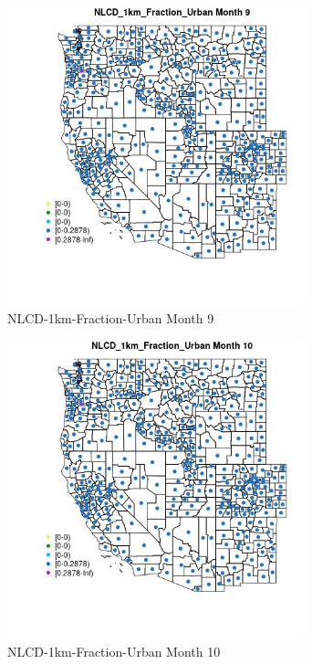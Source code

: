 \begin{figure} 
\centering  
\includegraphics[width=0.77\textwidth]{Code_Outputs/df_report_ML_predictors_CountyCentroid_Locations_Dates_2008-01-01to2018-12-31_MapObsMo9NLCD_1km_Fraction_Urban.jpg} 
\caption{\label{fig:df_report_ML_predictors_CountyCentroid_Locations_Dates_2008-01-01to2018-12-31MapObsMo9NLCD_1km_Fraction_Urban}NLCD-1km-Fraction-Urban Month 9} 
\end{figure} 
 

\begin{figure} 
\centering  
\includegraphics[width=0.77\textwidth]{Code_Outputs/df_report_ML_predictors_CountyCentroid_Locations_Dates_2008-01-01to2018-12-31_MapObsMo10NLCD_1km_Fraction_Urban.jpg} 
\caption{\label{fig:df_report_ML_predictors_CountyCentroid_Locations_Dates_2008-01-01to2018-12-31MapObsMo10NLCD_1km_Fraction_Urban}NLCD-1km-Fraction-Urban Month 10} 
\end{figure} 
 

